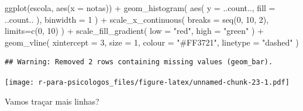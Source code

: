\documentclass[
]{book}
\newenvironment{Shaded}{\begin{snugshade}}{\end{snugshade}}
\newcommand{\AttributeTok}[1]{\textcolor[rgb]{0.77,0.63,0.00}{#1}}
\newcommand{\DecValTok}[1]{\textcolor[rgb]{0.00,0.00,0.81}{#1}}
\newcommand{\FunctionTok}[1]{\textcolor[rgb]{0.00,0.00,0.00}{#1}}
\newcommand{\NormalTok}[1]{#1}
\newcommand{\SpecialCharTok}[1]{\textcolor[rgb]{0.00,0.00,0.00}{#1}}
\newcommand{\StringTok}[1]{\textcolor[rgb]{0.31,0.60,0.02}{#1}}
\begin{document}
\begin{Shaded}
\begin{Highlighting}[]
\FunctionTok{ggplot}\NormalTok{(escola, }\FunctionTok{aes}\NormalTok{(}\AttributeTok{x =}\NormalTok{ notas)) }\SpecialCharTok{+} 
  \FunctionTok{geom\_histogram}\NormalTok{(}
    \FunctionTok{aes}\NormalTok{(}
      \AttributeTok{y =}\NormalTok{ ..count..,}
      \AttributeTok{fill =}\NormalTok{ ..count..}
\NormalTok{      ),}
    \AttributeTok{binwidth =} \DecValTok{1}
\NormalTok{  ) }\SpecialCharTok{+}
  \FunctionTok{scale\_x\_continuous}\NormalTok{(}
    \AttributeTok{breaks =} \FunctionTok{seq}\NormalTok{(}\DecValTok{0}\NormalTok{, }\DecValTok{10}\NormalTok{, }\DecValTok{2}\NormalTok{),}
    \AttributeTok{limits=}\FunctionTok{c}\NormalTok{(}\DecValTok{0}\NormalTok{, }\DecValTok{10}\NormalTok{)}
\NormalTok{  ) }\SpecialCharTok{+}
  \FunctionTok{scale\_fill\_gradient}\NormalTok{(}
    \AttributeTok{low =} \StringTok{"red"}\NormalTok{,}
    \AttributeTok{high =} \StringTok{"green"}
\NormalTok{  ) }\SpecialCharTok{+} 
  \FunctionTok{geom\_vline}\NormalTok{(}
    \AttributeTok{xintercept =} \DecValTok{3}\NormalTok{,}
    \AttributeTok{size =} \DecValTok{1}\NormalTok{,}
    \AttributeTok{colour =} \StringTok{"\#FF3721"}\NormalTok{,}
    \AttributeTok{linetype =} \StringTok{"dashed"}
\NormalTok{  )}
\end{Highlighting}
\end{Shaded}

\begin{verbatim}
## Warning: Removed 2 rows containing missing values (geom_bar).
\end{verbatim}

\texttt{[image: r-para-psicologos\_files/figure-latex/unnamed-chunk-23-1.pdf]}

Vamos traçar mais linhas?
\end{document}
